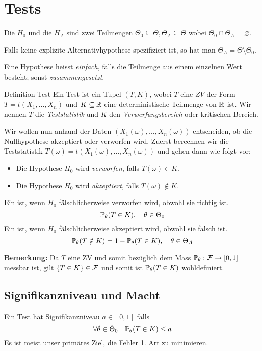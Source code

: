 \section{Tests}
\begin{subbox}{}
	Die  \(H_0\) und die  \(H_A\) sind zwei Teilmengen \(\Theta_0 \subseteq \Theta, \Theta_A \subseteq \Theta\) wobei \(\Theta_0 \cap \Theta_A = \varnothing\). 

	Falls keine explizite Alternativhypothese spezifiziert ist, so hat man $\Theta_A = \Theta \setminus \Theta_0$. 

	Eine Hypothese heisst \textit{einfach}, falls die Teilmenge aus einem einzelnen Wert besteht; sonst \textit{zusammengesetzt}.
\end{subbox}

\begin{mainbox}{Definition Test}
	Ein Test ist ein Tupel \((T,K)\), wobei \(T\) eine \(ZV\) der Form \(T=t(X_1, \ldots, X_n)\) und \(K \subseteq \R\) eine deterministische Teilmenge von \(\R\) ist. Wir nennen \(T\) die \textit{Teststatistik} und \(K\) den \textit{Verwerfungsbereich} oder kritischen Bereich.
\end{mainbox}

Wir wollen nun anhand der Daten \((X_1(\omega), \ldots, X_n(\omega))\) entscheiden, ob die Nullhypothese akzeptiert oder verworfen wird. Zuerst berechnen wir die Teststatistik \(T(\omega) = t(X_1(\omega), \ldots, X_n(\omega))\) und gehen dann wie folgt vor:
\begin{itemize}
	\item Die Hypothese \(H_0\) wird \textit{verworfen}, falls \(T(\omega) \in K\).
	\item Die Hypothese \(H_0\) wird \textit{akzeptiert}, falls \(T(\omega) \notin K\).
\end{itemize}
\begin{subbox}{}
	Ein  ist, wenn \(H_0\) fälschlicherweise verworfen wird, obwohl sie richtig ist.
	\[\P_\theta(T \in K), \quad \theta \in \Theta_0\]
	\noindent Ein  ist, wenn \(H_0\) fälschlicherweise akzeptiert wird, obwohl sie falsch ist.
	\[\P_\theta(T\notin K) = 1 - \P_\theta(T \in K), \quad \theta \in \Theta_A\]
\end{subbox}
\textbf{Bemerkung: } Da $T$ eine ZV und somit bezüglich dem Mass $\P_\theta: \F \to [0,1]$ messbar ist, gilt $\{T \in K\} \in \F$ und somit ist $\P_\theta(T \in K)$ wohldefiniert. 
\subsection{Signifikanzniveau und Macht}
Ein Test hat Signifikanzniveau \(a \in [0,1]\) falls
\[\forall \theta \in \Theta_0 \quad \P_\theta(T \in K) \le a\]
Es ist meist unser primäres Ziel, die Fehler 1. Art zu minimieren.

